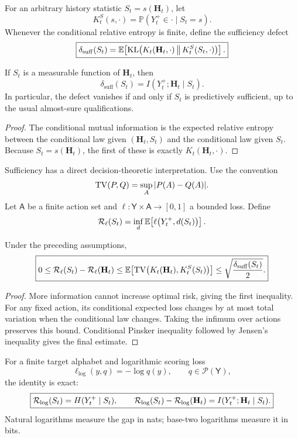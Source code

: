 For an arbitrary history statistic \(S_t=s(\mathbf H_t)\), let
\[
K_t^{S}(s,\cdot)
=
\mathbb P(Y_t^+\in\cdot\mid S_t=s).
\]
Whenever the conditional relative entropy is finite, define the sufficiency
defect
\[
\boxed{
\delta_{\mathrm{suff}}(S_t)
=
\mathbb E\!\left[
\operatorname{KL}\!\left(
K_t(\mathbf H_t,\cdot)
\,\middle\|\,
K_t^S(S_t,\cdot)
\right)
\right].
}
\]

\begin{proposition}\label{prop:conditional-information}
If \(S_t\) is a measurable function of \(\mathbf H_t\), then
\[
\boxed{
\delta_{\mathrm{suff}}(S_t)
=
I(Y_t^+;\mathbf H_t\mid S_t).
}
\]
In particular, the defect vanishes if and only if \(S_t\) is predictively
sufficient, up to the usual almost-sure qualifications.
\end{proposition}

\begin{proof}
The conditional mutual information is the expected relative entropy between
the conditional law given \((\mathbf H_t,S_t)\) and the conditional law given
\(S_t\). Because \(S_t=s(\mathbf H_t)\), the first of these is exactly
\(K_t(\mathbf H_t,\cdot)\).
\end{proof}

Sufficiency has a direct decision-theoretic interpretation. Use the
convention
\[
\operatorname{TV}(P,Q)=\sup_{A}|P(A)-Q(A)|.
\]
Let \(\mathsf A\) be a finite action set and
\(\ell:\mathsf Y\times\mathsf A\to[0,1]\) a bounded loss. Define
\[
\mathcal R_\ell(S_t)
=
\inf_{d}
\mathbb E\!\left[
\ell\bigl(Y_t^+,d(S_t)\bigr)
\right].
\]

\begin{proposition}
\label{prop:risk-pinsker}
Under the preceding assumptions,
\[
\boxed{
0
\leq
\mathcal R_\ell(S_t)-\mathcal R_\ell(\mathbf H_t)
\leq
\mathbb E\!\left[
\operatorname{TV}\!\left(K_t(\mathbf H_t),K_t^S(S_t)\right)
\right]
\leq
\sqrt{\frac{\delta_{\mathrm{suff}}(S_t)}{2}}.
}
\]
\end{proposition}

\begin{proof}
More information cannot increase optimal risk, giving the first inequality.
For any fixed action, its conditional expected loss changes by at most total
variation when the conditional law changes. Taking the infimum over actions
preserves this bound. Conditional Pinsker inequality followed by Jensen's
inequality gives the final estimate.
\end{proof}

For a finite target alphabet and logarithmic scoring loss
\[
\ell_{\log}(y,q)=-\log q(y),
\qquad
q\in\mathcal P(\mathsf Y),
\]
the identity is exact:
\[
\boxed{
\mathcal R_{\log}(S_t)=H(Y_t^+\mid S_t),
\qquad
\mathcal R_{\log}(S_t)-\mathcal R_{\log}(\mathbf H_t)
=
I(Y_t^+;\mathbf H_t\mid S_t).
}
\]
Natural logarithms measure the gap in nats; base-two logarithms measure it in
bits.

